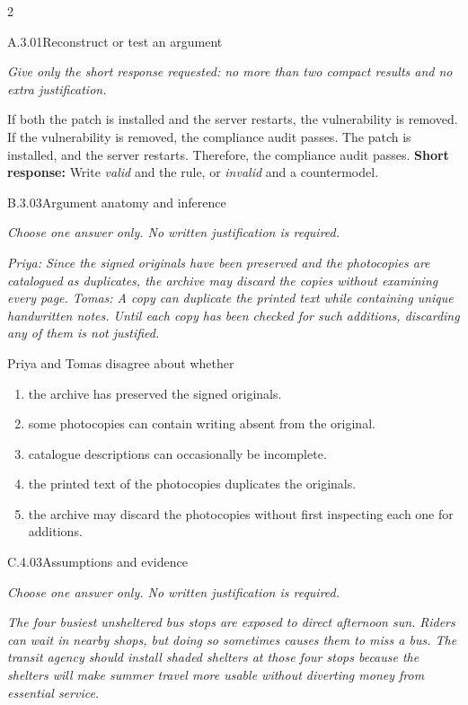 \documentclass[9pt]{extarticle}
\newcommand{\choice}[1]{\item #1}
\begin{document}
\begin{multicols}{2}
\begin{DenseCoreProblem}{A.3.01}{Reconstruct or test an argument}
{\scriptsize\textit{Give only the short response requested: no more than two compact results and no extra justification.}\par}
If both the patch is installed and the server restarts, the vulnerability is removed. If the vulnerability is removed, the compliance audit passes. The patch is installed, and the server restarts. Therefore, the compliance audit passes.
\textbf{Short response:} Write \emph{valid} and the rule, or \emph{invalid} and a countermodel.
\end{DenseCoreProblem}
\begin{DenseCoreProblem}{B.3.03}{Argument anatomy and inference}
{\scriptsize\textit{Choose one answer only. No written justification is required.}\par}
\emph{Priya: Since the signed originals have been preserved and the photocopies are catalogued as duplicates, the archive may discard the copies without examining every page. Tomas: A copy can duplicate the printed text while containing unique handwritten notes. Until each copy has been checked for such additions, discarding any of them is not justified.}

Priya and Tomas disagree about whether
\begin{enumerate}[label=(\alph*)]
  \choice{the archive has preserved the signed originals.}
  \choice{some photocopies can contain writing absent from the original.}
  \choice{catalogue descriptions can occasionally be incomplete.}
  \choice{the printed text of the photocopies duplicates the originals.}
  \choice{the archive may discard the photocopies without first inspecting each one for additions.}
\end{enumerate}
\end{DenseCoreProblem}
\columnbreak
\begin{DenseCoreProblem}{C.4.03}{Assumptions and evidence}
{\scriptsize\textit{Choose one answer only. No written justification is required.}\par}
\emph{The four busiest unsheltered bus stops are exposed to direct afternoon sun. Riders can wait in nearby shops, but doing so sometimes causes them to miss a bus. The transit agency should install shaded shelters at those four stops because the shelters will make summer travel more usable without diverting money from essential service.}


\end{DenseCoreProblem}
\end{multicols}
\end{document}
